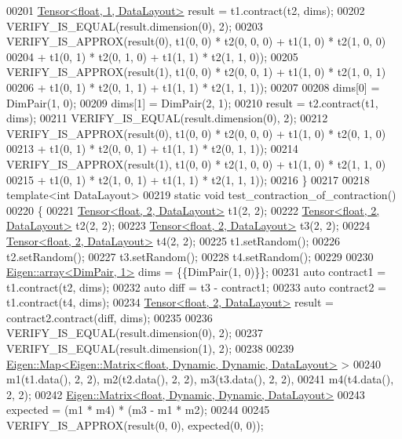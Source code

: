 \begin{DoxyCode}
00201   \hyperlink{class_eigen_1_1_tensor}{Tensor<float, 1, DataLayout>} result = t1.contract(t2, dims);
00202   VERIFY\_IS\_EQUAL(result.dimension(0), 2);
00203   VERIFY\_IS\_APPROX(result(0), t1(0, 0) * t2(0, 0, 0) +  t1(1, 0) * t2(1, 0, 0)
00204                             + t1(0, 1) * t2(0, 1, 0) +  t1(1, 1) * t2(1, 1, 0));
00205   VERIFY\_IS\_APPROX(result(1), t1(0, 0) * t2(0, 0, 1) +  t1(1, 0) * t2(1, 0, 1)
00206                             + t1(0, 1) * t2(0, 1, 1) +  t1(1, 1) * t2(1, 1, 1));
00207 
00208   dims[0] = DimPair(1, 0);
00209   dims[1] = DimPair(2, 1);
00210   result = t2.contract(t1, dims);
00211   VERIFY\_IS\_EQUAL(result.dimension(0), 2);
00212   VERIFY\_IS\_APPROX(result(0), t1(0, 0) * t2(0, 0, 0) +  t1(1, 0) * t2(0, 1, 0)
00213                             + t1(0, 1) * t2(0, 0, 1) +  t1(1, 1) * t2(0, 1, 1));
00214   VERIFY\_IS\_APPROX(result(1), t1(0, 0) * t2(1, 0, 0) +  t1(1, 0) * t2(1, 1, 0)
00215                             + t1(0, 1) * t2(1, 0, 1) +  t1(1, 1) * t2(1, 1, 1));
00216 \}
00217 
00218 \textcolor{keyword}{template}<\textcolor{keywordtype}{int} DataLayout>
00219 \textcolor{keyword}{static} \textcolor{keywordtype}{void} test\_contraction\_of\_contraction()
00220 \{
00221   \hyperlink{class_eigen_1_1_tensor}{Tensor<float, 2, DataLayout>} t1(2, 2);
00222   \hyperlink{class_eigen_1_1_tensor}{Tensor<float, 2, DataLayout>} t2(2, 2);
00223   \hyperlink{class_eigen_1_1_tensor}{Tensor<float, 2, DataLayout>} t3(2, 2);
00224   \hyperlink{class_eigen_1_1_tensor}{Tensor<float, 2, DataLayout>} t4(2, 2);
00225   t1.setRandom();
00226   t2.setRandom();
00227   t3.setRandom();
00228   t4.setRandom();
00229 
00230   \hyperlink{class_eigen_1_1array}{Eigen::array<DimPair, 1>} dims = \{\{DimPair(1, 0)\}\};
00231   \textcolor{keyword}{auto} contract1 = t1.contract(t2, dims);
00232   \textcolor{keyword}{auto} diff = t3 - contract1;
00233   \textcolor{keyword}{auto} contract2 = t1.contract(t4, dims);
00234   \hyperlink{class_eigen_1_1_tensor}{Tensor<float, 2, DataLayout>} result = contract2.contract(diff, dims);
00235 
00236   VERIFY\_IS\_EQUAL(result.dimension(0), 2);
00237   VERIFY\_IS\_EQUAL(result.dimension(1), 2);
00238 
00239   \hyperlink{group___core___module_class_eigen_1_1_map}{Eigen::Map<Eigen::Matrix<float, Dynamic, Dynamic, DataLayout>}
      >
00240       m1(t1.data(), 2, 2), m2(t2.data(), 2, 2), m3(t3.data(), 2, 2),
00241       m4(t4.data(), 2, 2);
00242   \hyperlink{group___core___module_class_eigen_1_1_matrix}{Eigen::Matrix<float, Dynamic, Dynamic, DataLayout>}
00243       expected = (m1 * m4) * (m3 - m1 * m2);
00244 
00245   VERIFY\_IS\_APPROX(result(0, 0), expected(0, 0));

\end{DoxyCode}
